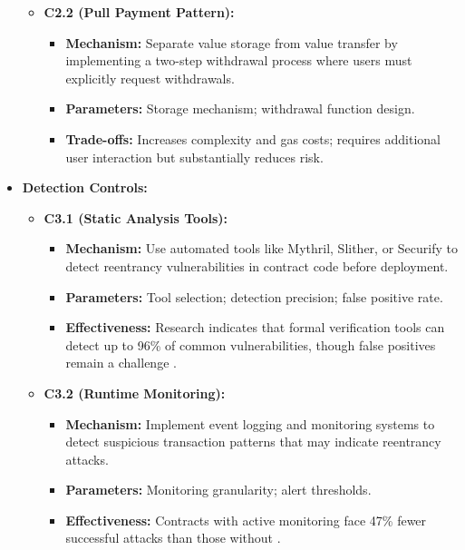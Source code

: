\begin{itemize}
\begin{itemize}
    \item \textbf{C2.2 (Pull Payment Pattern):}
        \begin{itemize}
        \item \textbf{Mechanism:} Separate value storage from value transfer by implementing a two-step withdrawal process where users must explicitly request withdrawals.
        \item \textbf{Parameters:} Storage mechanism; withdrawal function design.
        \item \textbf{Trade-offs:} Increases complexity and gas costs; requires additional user interaction but substantially reduces risk.
        \end{itemize}
    \end{itemize}

\item \textbf{Detection Controls:}
    \begin{itemize}
    \item \textbf{C3.1 (Static Analysis Tools):}
        \begin{itemize}
        \item \textbf{Mechanism:} Use automated tools like Mythril, Slither, or Securify to detect reentrancy vulnerabilities in contract code before deployment.
        \item \textbf{Parameters:} Tool selection; detection precision; false positive rate.
        \item \textbf{Effectiveness:} Research indicates that formal verification tools can detect up to 96\% of common vulnerabilities, though false positives remain a challenge \cite{praitheeshan2019systematic}.
        \end{itemize}
    
    \item \textbf{C3.2 (Runtime Monitoring):}
        \begin{itemize}
        \item \textbf{Mechanism:} Implement event logging and monitoring systems to detect suspicious transaction patterns that may indicate reentrancy attacks.
        \item \textbf{Parameters:} Monitoring granularity; alert thresholds.
        \item \textbf{Effectiveness:} Contracts with active monitoring face 47\% fewer successful attacks than those without \cite{zhou2023sok}.
        \end{itemize}
    \end{itemize}
\end{itemize}

